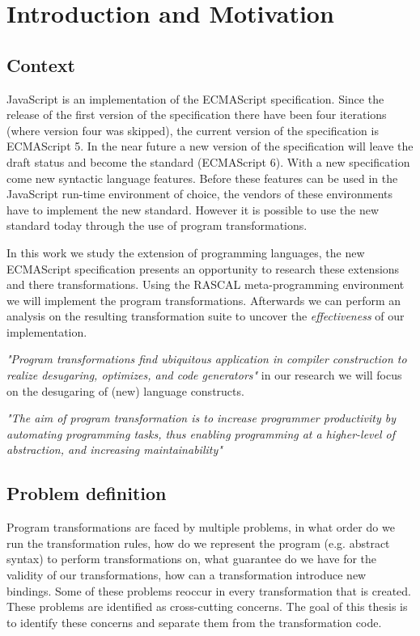 
\chapter{Introduction and Motivation}

\label{Chapter1}


\section{Context}
JavaScript is an implementation of the ECMAScript specification. Since the release of the first version of the specification there have been four iterations (where version four was skipped), the current version of the specification is ECMAScript 5. In the near future a new version of the specification will leave the draft status and become the standard (ECMAScript 6). With a new specification come new syntactic language features. Before these features can be used in the JavaScript run-time environment of choice, the vendors of these environments have to implement the new standard. However it is possible to use the new standard today through the use of program transformations.

In this work we study the extension of programming languages, the new ECMAScript specification presents an opportunity to research these extensions and there transformations. Using the RASCAL meta-programming environment\citep{Klint} we will implement the program transformations. Afterwards we can perform an analysis on the resulting transformation suite to uncover the \emph{effectiveness} of our implementation.

\textit{"Program transformations find ubiquitous application in compiler construction to realize desugaring, optimizes, and code generators"}\cite{Erdweg2014} 
in our research we will focus on the desugaring of (new) language constructs.  

\textit{"The aim of program transformation is to increase programmer productivity by automating programming tasks, thus enabling programming at a higher-level of abstraction, and increasing maintainability"}\cite{Visser2001}

\section{Problem definition}
Program transformations are faced by multiple problems, in what order do we run the transformation rules, how do we represent the program (e.g. abstract syntax) to perform transformations on, what guarantee do we have for the validity of our transformations, how can a transformation introduce new bindings.  
Some of these problems reoccur in every transformation that is created. These problems are identified as cross-cutting concerns. The goal of this thesis is to identify these concerns and separate them from the transformation code. 

